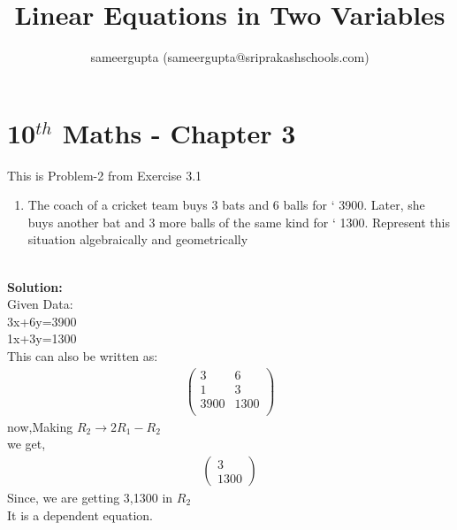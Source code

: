 \documentclass[12pt]{article}
\title{Linear Equations in Two Variables}
\author{sameergupta (sameergupta@sriprakashschools.com)}
\newcommand{\myvec}[1]{\ensuremath{\begin{pmatrix}#1\end{pmatrix}}}
\newcommand{\solution}{\noindent \textbf{Solution: }}
\begin{document}
\maketitle
\section*{10$^{th}$ Maths - Chapter 3}
This is Problem-2 from Exercise 3.1
\begin{enumerate}
\item The coach of a cricket team buys 3 bats and 6 balls for ` 3900. Later, she buys another bat and 3 more balls of the same kind for ` 1300. Represent this situation algebraically and geometrically\\\\
\end{enumerate}
\solution \\
Given Data:\\
            3x+6y=3900\\
            1x+3y=1300\\

This can also be written as:
\begin{align}
\myvec{3&6\\1&3\\3900&1300\\}
\end{align}
now,Making $R_2 \xrightarrow\ 2R_1 - R_2$\\ 
we get,
\begin{align}
\myvec{3\\1300}
\end{align}
Since, we are getting 3,1300 in $R_2$\\
It is a dependent equation.
\end{document}
